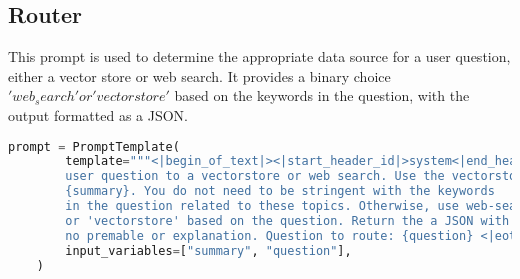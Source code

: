 \subsection{Router}

This prompt is used to determine the appropriate data source for a user question, either a vector store or web search. It provides a binary choice \('web_search' or 'vectorstore'\) based on the keywords in the question, with the output formatted as a JSON.

\begin{lstlisting}[language=Python, caption=\it{Prompt used for the hallucination grader.}]
    prompt = PromptTemplate(
        template="""<|begin_of_text|><|start_header_id|>system<|end_header_id|> You are an expert at routing a 
        user question to a vectorstore or web search. Use the vectorstore for questions on LLM  agents, 
        {summary}. You do not need to be stringent with the keywords 
        in the question related to these topics. Otherwise, use web-search. Give a binary choice 'web_search' 
        or 'vectorstore' based on the question. Return the a JSON with a single key 'datasource' and 
        no premable or explanation. Question to route: {question} <|eot_id|><|start_header_id|>assistant<|end_header_id|>""",
        input_variables=["summary", "question"],
    )
\end{lstlisting}